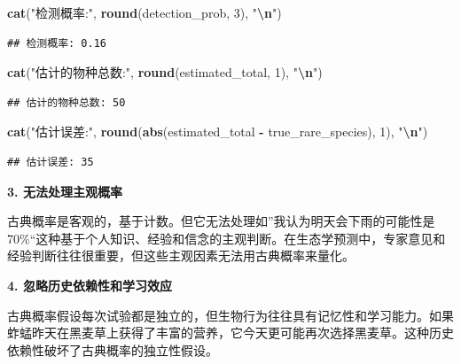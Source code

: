 \documentclass[
]{book}
\newenvironment{Shaded}{\begin{snugshade}}{\end{snugshade}}
\newcommand{\DecValTok}[1]{\textcolor[rgb]{0.00,0.00,0.81}{#1}}
\newcommand{\FunctionTok}[1]{\textcolor[rgb]{0.13,0.29,0.53}{\textbf{#1}}}
\newcommand{\NormalTok}[1]{#1}
\newcommand{\SpecialCharTok}[1]{\textcolor[rgb]{0.81,0.36,0.00}{\textbf{#1}}}
\newcommand{\StringTok}[1]{\textcolor[rgb]{0.31,0.60,0.02}{#1}}
\begin{document}
\begin{Shaded}
\begin{Highlighting}[]
\FunctionTok{cat}\NormalTok{(}\StringTok{"检测概率:"}\NormalTok{, }\FunctionTok{round}\NormalTok{(detection\_prob, }\DecValTok{3}\NormalTok{), }\StringTok{"}\SpecialCharTok{\textbackslash{}n}\StringTok{"}\NormalTok{)}
\end{Highlighting}
\end{Shaded}

\begin{verbatim}
## 检测概率: 0.16
\end{verbatim}

\begin{Shaded}
\begin{Highlighting}[]
\FunctionTok{cat}\NormalTok{(}\StringTok{"估计的物种总数:"}\NormalTok{, }\FunctionTok{round}\NormalTok{(estimated\_total, }\DecValTok{1}\NormalTok{), }\StringTok{"}\SpecialCharTok{\textbackslash{}n}\StringTok{"}\NormalTok{)}
\end{Highlighting}
\end{Shaded}

\begin{verbatim}
## 估计的物种总数: 50
\end{verbatim}

\begin{Shaded}
\begin{Highlighting}[]
\FunctionTok{cat}\NormalTok{(}\StringTok{"估计误差:"}\NormalTok{, }\FunctionTok{round}\NormalTok{(}\FunctionTok{abs}\NormalTok{(estimated\_total }\SpecialCharTok{{-}}\NormalTok{ true\_rare\_species), }\DecValTok{1}\NormalTok{), }\StringTok{"}\SpecialCharTok{\textbackslash{}n}\StringTok{"}\NormalTok{)}
\end{Highlighting}
\end{Shaded}

\begin{verbatim}
## 估计误差: 35
\end{verbatim}

\textbf{3. 无法处理主观概率}

古典概率是客观的，基于计数。但它无法处理如''我认为明天会下雨的可能性是70\%``这种基于个人知识、经验和信念的主观判断。在生态学预测中，专家意见和经验判断往往很重要，但这些主观因素无法用古典概率来量化。

\textbf{4. 忽略历史依赖性和学习效应}

古典概率假设每次试验都是独立的，但生物行为往往具有记忆性和学习能力。如果蚱蜢昨天在黑麦草上获得了丰富的营养，它今天更可能再次选择黑麦草。这种历史依赖性破坏了古典概率的独立性假设。
\end{document}
